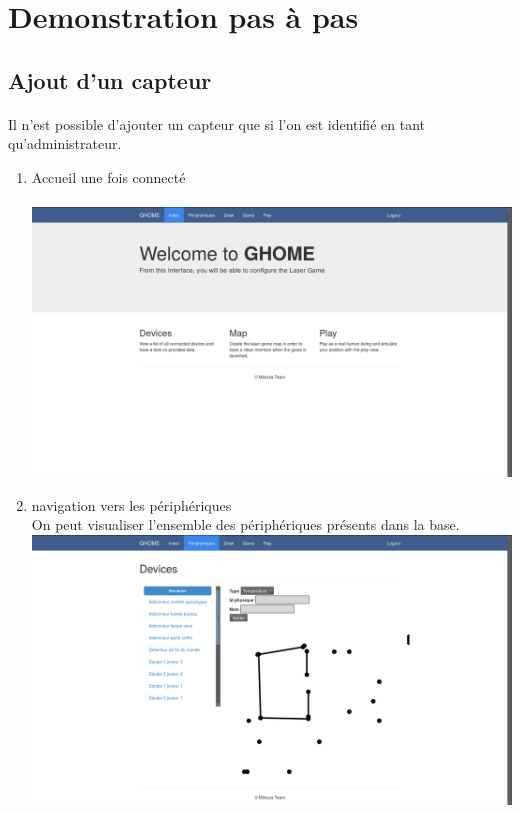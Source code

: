 \section{Demonstration pas à pas}
\subsection{Ajout d'un capteur}
\paragraph{} Il n'est possible d'ajouter un capteur que si l'on est identifié en tant qu'administrateur.

\begin{enumerate}
\item Accueil une fois connecté\\
~~\\
\includegraphics[scale=0.25]{image/homeAdmin.png}\\
\item navigation vers les périphériques\\
On peut visualiser l'ensemble des périphériques présents dans la base.
~~\\
\includegraphics[scale=0.25]{image/newPeriph.png}\\

\end{enumerate}
